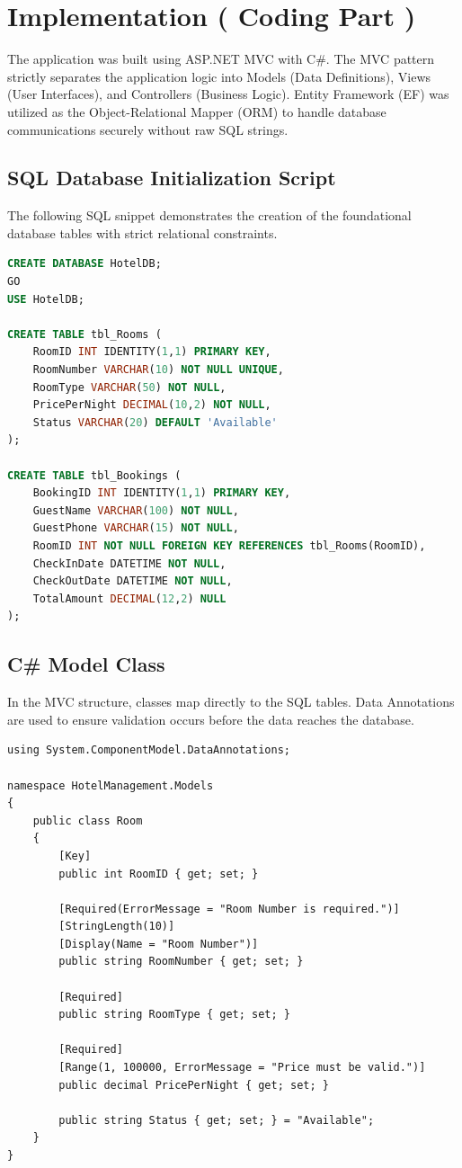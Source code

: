 \documentclass[12pt,a4paper]{article}
\begin{document}
\newpage
\section{Implementation ( Coding Part )}
The application was built using ASP.NET MVC with C\#. The MVC pattern strictly separates the application logic into Models (Data Definitions), Views (User Interfaces), and Controllers (Business Logic). Entity Framework (EF) was utilized as the Object-Relational Mapper (ORM) to handle database communications securely without raw SQL strings.

\subsection{SQL Database Initialization Script}
The following SQL snippet demonstrates the creation of the foundational database tables with strict relational constraints.

\begin{lstlisting}[language=SQL, caption=SQL Script for Table Creation]
CREATE DATABASE HotelDB;
GO
USE HotelDB;

CREATE TABLE tbl_Rooms (
    RoomID INT IDENTITY(1,1) PRIMARY KEY,
    RoomNumber VARCHAR(10) NOT NULL UNIQUE,
    RoomType VARCHAR(50) NOT NULL,
    PricePerNight DECIMAL(10,2) NOT NULL,
    Status VARCHAR(20) DEFAULT 'Available'
);

CREATE TABLE tbl_Bookings (
    BookingID INT IDENTITY(1,1) PRIMARY KEY,
    GuestName VARCHAR(100) NOT NULL,
    GuestPhone VARCHAR(15) NOT NULL,
    RoomID INT NOT NULL FOREIGN KEY REFERENCES tbl_Rooms(RoomID),
    CheckInDate DATETIME NOT NULL,
    CheckOutDate DATETIME NOT NULL,
    TotalAmount DECIMAL(12,2) NULL
);
\end{lstlisting}

\subsection{C\# Model Class}
In the MVC structure, classes map directly to the SQL tables. Data Annotations are used to ensure validation occurs before the data reaches the database.

\begin{lstlisting}[language={[Sharp]C}, caption=C\# Room Model with Validation]
using System.ComponentModel.DataAnnotations;

namespace HotelManagement.Models
{
    public class Room
    {
        [Key]
        public int RoomID { get; set; }

        [Required(ErrorMessage = "Room Number is required.")]
        [StringLength(10)]
        [Display(Name = "Room Number")]
        public string RoomNumber { get; set; }

        [Required]
        public string RoomType { get; set; }

        [Required]
        [Range(1, 100000, ErrorMessage = "Price must be valid.")]
        public decimal PricePerNight { get; set; }

        public string Status { get; set; } = "Available";
    }
}
\end{lstlisting}
\end{document}
